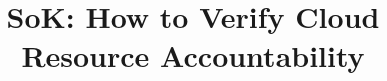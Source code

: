 \documentclass[10pt, conference]{IEEEtran}
\begin{document}
\title{SoK: How to Verify Cloud Resource Accountability}

\maketitle

       









%
%

%
\end{document}
